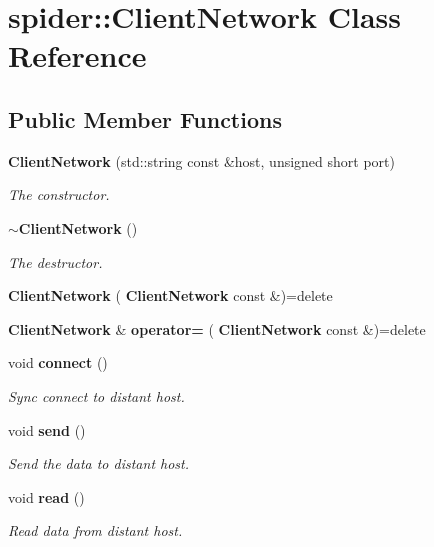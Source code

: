\section{spider\+:\+:Client\+Network Class Reference}
\label{classspider_1_1_client_network}
\subsection*{Public Member Functions}
\begin{DoxyCompactItemize}
\item 
\textbf{ Client\+Network} (std\+::string const \&host, unsigned short port)
\begin{DoxyCompactList}\small\item\em The constructor. \end{DoxyCompactList}\item 
\mbox{\label{classspider_1_1_client_network_a1e24a6b70b45997fee897caeb3c0c49f}} 
\textbf{ $\sim$\+Client\+Network} ()
\begin{DoxyCompactList}\small\item\em The destructor. \end{DoxyCompactList}\item 
\mbox{\label{classspider_1_1_client_network_ac754d8a8cdd2d84e47b6b73fecc46700}} 
{\bfseries Client\+Network} (\textbf{ Client\+Network} const \&)=delete
\item 
\mbox{\label{classspider_1_1_client_network_ac0761e47764b838996e2b65c5282ce28}} 
\textbf{ Client\+Network} \& {\bfseries operator=} (\textbf{ Client\+Network} const \&)=delete
\item 
\mbox{\label{classspider_1_1_client_network_ab308d2c05e4e306344534b0f2d0d5016}} 
void \textbf{ connect} ()
\begin{DoxyCompactList}\small\item\em Sync connect to distant host. \end{DoxyCompactList}\item 
\mbox{\label{classspider_1_1_client_network_ab43d94d1843e5991dd715b0bf605ee62}} 
void \textbf{ send} ()
\begin{DoxyCompactList}\small\item\em Send the data to distant host. \end{DoxyCompactList}\item 
\mbox{\label{classspider_1_1_client_network_a3d98ad273897cc17cc2b91ada502ad35}} 
void \textbf{ read} ()
\begin{DoxyCompactList}\small\item\em Read data from distant host. \end{DoxyCompactList}\end{DoxyCompactItemize}



